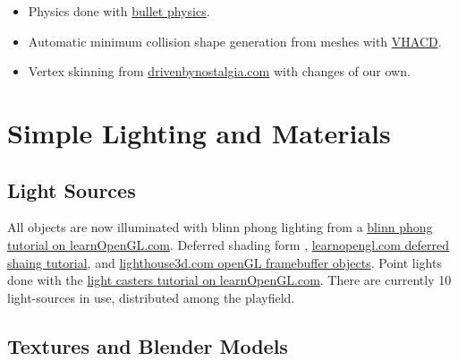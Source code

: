 \documentclass[12pt]{article}
\begin{document}
\begin{itemize}
  \item Physics done with \href{http://bulletphysics.org/wordpress/}{bullet physics}.

  \item Automatic minimum collision shape generation from meshes with \href{https://github.com/kmammou/v-hacd}{VHACD}.

  \item Vertex skinning from \href{http://drivenbynostalgia.com/}{drivenbynostalgia.com} with changes of our own.
\end{itemize}


\section{Simple Lighting and Materials}


\subsection{Light Sources \label{lightSources}}
All objects are now illuminated with blinn phong lighting from a \href{http://learnopengl.com/#!Advanced-Lighting/Advanced-Lighting}{blinn phong tutorial on learnOpenGL.com}. Deferred shading form \cite{openGLSuperBible}, \href{http://learnopengl.com/#!Advanced-Lighting/Deferred-Shading}{learnopengl.com deferred shaing tutorial}, and \href{http://www.lighthouse3d.com/tutorials/opengl_framebuffer_objects/}{lighthouse3d.com openGL framebuffer objects}.
Point lights done with the \href{http://learnopengl.com/#!Lighting/Light-casters}{light casters tutorial on learnOpenGL.com}. There are currently 10 light-sources in use, distributed among the playfield.


\subsection{Textures and Blender Models}
\end{document}
